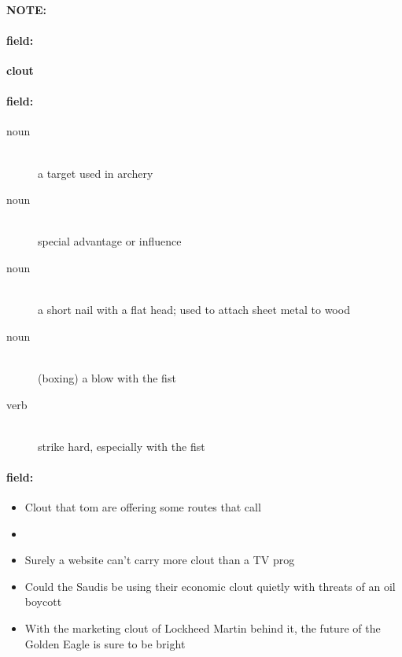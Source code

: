 \documentclass[12pt]{article}
\newenvironment{note}{\paragraph{NOTE:}}{}
\newenvironment{field}{\paragraph{field:}}{}
\begin{document}
\begin{note}
\begin{field}
\textbf{\large clout}
\end{field}


\begin{field}
\begin{description}
\item[noun] \hfill \\ 
a target used in archery

\item[noun] \hfill \\ 
special advantage or influence

\item[noun] \hfill \\ 
a short nail with a flat head; used to attach sheet metal to wood

\item[noun] \hfill \\ 
(boxing) a blow with the fist

\item[verb] \hfill \\ 
strike hard, especially with the fist

\end{description}
\end{field}

\begin{field}
\begin{itemize}
\item Clout that tom are offering some routes that call
\item 
\item Surely a website can't carry more clout than a TV prog
\item Could the Saudis be using their economic clout quietly with threats of an oil boycott
\item With the marketing clout of Lockheed Martin behind it, the future of the Golden Eagle is sure to be bright
\end{itemize}
\end{field}
\end{note}
\end{document}
